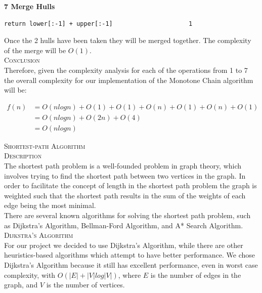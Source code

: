 \documentclass[pdftex,12pt,a4paper]{article}
\newcommand{\nspace}{\\[0.25cm]}
\newcommand{\lspace}{\\[0.50cm]}
\newcommand{\Lspace}{\\[1.0cm]}
\begin{document}
{\bf \large 7 Merge Hulls}
\begin{verbatim}
return lower[:-1] + upper[:-1]                     1
\end{verbatim}

Once the 2 hulls have been taken they will be merged together. The complexity of the merge will be $O(1)$.\lspace




\newpage
\textsc{\Large Conclusion} \hfill \nspace

Therefore, given the complexity analysis for each of the operations from 1 to 7 the overall complexity for our implementation of the Monotone Chain algorithm will be:

\begin{equation}
\begin{split}
f(n) &= O(nlogn) + O(1) + O(1) + O(n) + O(1) + O(n) + O(1)\\
     &= O(nlogn) + O(2n) + O(4)\\
     &= O(nlogn)
\end{split}
\end{equation}
















\newpage
\textsc{\Huge Shortest-path Algorithm} \hfill \Lspace

\textsc{\Large Description} \hfill \nspace

The shortest path problem is a well-founded problem in graph theory, which involves trying to find the shortest path between two vertices in the graph. In order to facilitate the concept of length in the shortest path problem the graph is weighted such that the shortest path results in the sum of the weights of each edge being the most minimal.\nspace

There are several known algorithms for solving the shortest path problem, such as Dijkstra's Algorithm, Bellman-Ford Algorithm, and A* Search Algorithm.\lspace



\textsc{\Large Dijkstra's Algorithm} \hfill \nspace

For our project we decided to use Dijkstra's Algorithm, while there are other heuristics-based algorithms which attempt to have better performance. We chose Dijkstra's Algorithm because it still has excellent performance, even in worst case complexity, with $O(|E| + |V| log |V|) $\cite{cormen2001introduction}, where $E$ is the number of edges in the graph, and $V$ is the number of vertices.\nspace
\end{document}
